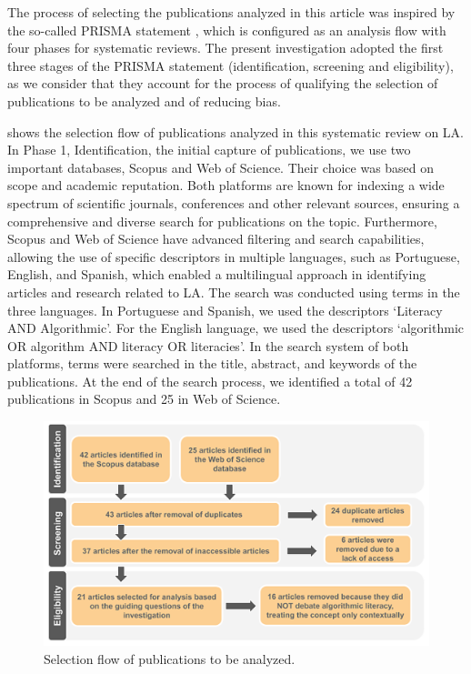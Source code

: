 The process of selecting the publications analyzed in this article was inspired by the so-called PRISMA statement \cite{Moher2009}, which is configured as an analysis flow with four phases for systematic reviews. The present investigation adopted the first three stages of the PRISMA statement (identification, screening and eligibility), as we consider that they account for the process of qualifying the selection of publications to be analyzed and of reducing bias.

 shows the selection flow of publications analyzed in this systematic review on LA. In Phase 1, Identification, the initial capture of publications, we use two important databases, Scopus and Web of Science. Their choice was based on scope and academic reputation. Both platforms are known for indexing a wide spectrum of scientific journals, conferences and other relevant sources, ensuring a comprehensive and diverse search for publications on the topic. Furthermore, Scopus and Web of Science have advanced filtering and search capabilities, allowing the use of specific descriptors in multiple languages, such as Portuguese, English, and Spanish, which enabled a multilingual approach in identifying articles and research related to LA. The search was conducted using terms in the three languages. In Portuguese and Spanish, we used the descriptors ‘Literacy AND Algorithmic’. For the English language, we used the descriptors ‘algorithmic OR algorithm AND literacy OR literacies’. In the search system of both platforms, terms were searched in the title, abstract, and keywords of the publications. At the end of the search process, we identified a total of 42 publications in Scopus and 25 in Web of Science.

\begin{figure}[h!]
\centering
\begin{minipage}{0.85\textwidth}
\caption{Selection flow of publications to be analyzed.}
\label{image-01}
\includegraphics[width=\linewidth]{image1_en.png}
\end{minipage}
\end{figure}

